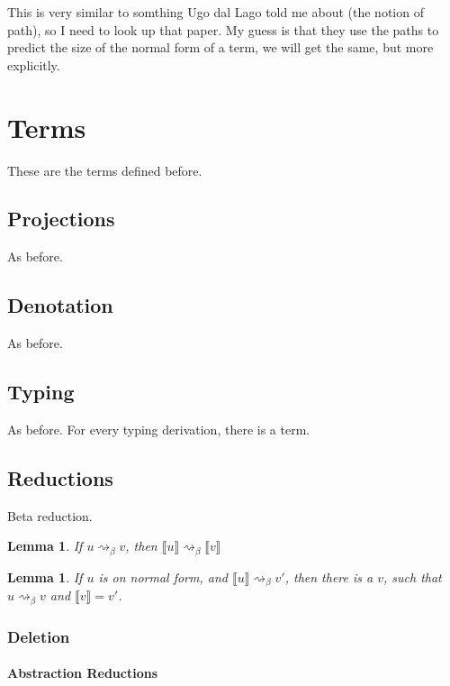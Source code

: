 \documentclass[11pt,a4paper]{article}
\theoremstyle{definition}
\theoremstyle{plain}
\newtheorem{lemma}[definition]{Lemma}
\theoremstyle{remark}
\begin{document}
This is very similar to somthing Ugo dal Lago told me about (the notion of path), so I need to look up that paper. My guess is that they use the paths to predict the size of the normal form of a term, we will get the same, but more explicitly.

\section{Terms}

These are the terms defined before.

\subsection{Projections}

As before.

\subsection{Denotation}

As before.

\subsection{Typing}

As before. For every typing derivation, there is a term.

\subsection{Reductions}

Beta reduction.

\begin{lemma}
If $u\rightsquigarrow_\beta v$, then $\llbracket u\rrbracket \rightsquigarrow_\beta\llbracket v\rrbracket$
\end{lemma}

\begin{lemma}
If $u$ is on normal form, and $\llbracket u\rrbracket\rightsquigarrow_\beta v'$, then there is a $v$, such that $u\rightsquigarrow_\beta v$ and $\llbracket v\rrbracket=v'$.
\end{lemma}

\subsubsection{Deletion}

\paragraph{Abstraction Reductions}
\end{document}
